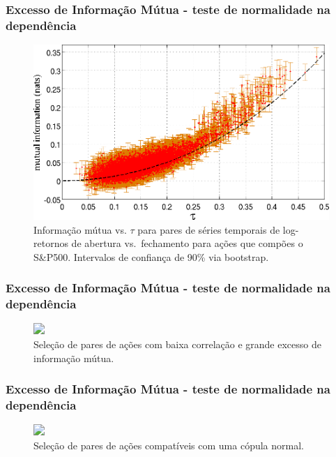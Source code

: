 \documentclass[ignorenonframetext,]{beamer}
\makeatletter
\def\ScaleIfNeededV{%
  \ifdim\Gin@nat@width>0.9\linewidth
    0.9\linewidth
  \else
    \Gin@nat@width
  \fi
}
\def\ScaleIfNeededH{%
  \ifdim\Gin@nat@height>0.9\textheight
    0.9\textheight
  \else
    \Gin@nat@height
  \fi
}
\let\Oldincludegraphics\includegraphics
\renewcommand{\includegraphics}[2][]{\Oldincludegraphics[width=\ScaleIfNeededV,height=\ScaleIfNeededH,keepaspectratio]{#2}}
\makeatother
\begin{document}
\begin{frame}\frametitle{Excesso de Informação Mútua - teste de
normalidade na dependência}

\begin{figure}[htbp]
\centering
\includegraphics{./figs/MIvsrho_tau_final2.png}
\caption{Informação mútua vs. $\tau$ para pares de séries temporais de
log-retornos de abertura vs.~fechamento para ações que compões o
S\&P500. Intervalos de confiança de 90\% via bootstrap.}
\end{figure}

\end{frame}

\begin{frame}\frametitle{Excesso de Informação Mútua - teste de
normalidade na dependência}

\begin{figure}[htbp]
\centering
\Oldincludegraphics[width=0.85\textwidth]{./figs/locohimi.png}
\caption{Seleção de pares de ações com baixa correlação e grande excesso
de informação mútua.}
\end{figure}

\end{frame}

\begin{frame}\frametitle{Excesso de Informação Mútua - teste de
normalidade na dependência}

\begin{figure}[htbp]
\centering
\Oldincludegraphics[width=0.85\textwidth]{./figs/gausscompat.png}
\caption{Seleção de pares de ações compatíveis com uma cópula normal.}
\end{figure}

\end{frame}
\end{document}
